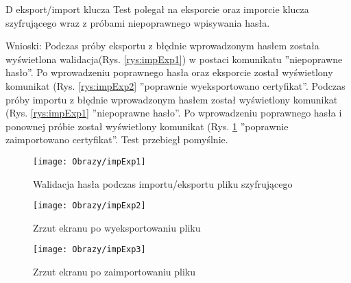 \begin{enumerate*}
\begin{figure}[ht!]
			
		\end{figure}
		
	\item  D eksport/import klucza
	Test polegał na eksporcie oraz imporcie klucza szyfrującego wraz z próbami niepoprawnego wpisywania hasła.
	
	Wnioski: Podczas próby eksportu z błędnie wprowadzonym hasłem została wyświetlona walidacja(Rys. \ref{rys:impExp1}) w postaci komunikatu ''niepoprawne hasło''. Po wprowadzeniu poprawnego hasła oraz eksporcie został wyświetlony komunikat (Rys. \ref{rys:impExp2} ''poprawnie wyeksportowano certyfikat''. Podczas próby importu z błędnie wprowadzonym hasłem został wyświetlony komunikat (Rys. \ref{rys:impExp1} ''niepoprawne hasło''. Po wprowadzeniu poprawnego hasła i ponownej próbie został wyświetlony komunikat (Rys. \ref{rys:impExp3} ''poprawnie zaimportowano certyfikat''. Test przebiegł pomyślnie.
	
	
	
	\begin{figure}[ht!]
		\begin{minipage}{0.2\textwidth}
			\texttt{[image: Obrazy/impExp1]}
			\caption{Walidacja hasła podczas importu/eksportu pliku szyfrującego }
			\label{rys:impExp1}
		\end{minipage}
		\begin{minipage}{0.2\textwidth}
			\texttt{[image: Obrazy/impExp2]}
			\caption{Zrzut ekranu po wyeksportowaniu pliku }
			\label{rys:impExp2}
		\end{minipage}
		
		\begin{minipage}{0.2\textwidth}
			\texttt{[image: Obrazy/impExp3]}
			\caption{Zrzut ekranu po zaimportowaniu pliku }
			\label{rys:impExp3}
		\end{minipage}
		
		
		
		
	\end{figure}
	
\end{enumerate*}
